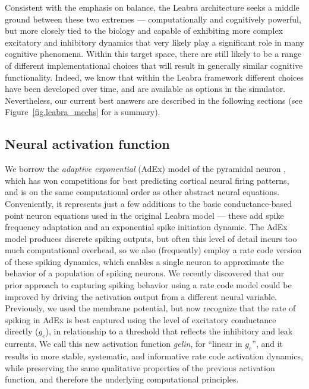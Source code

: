 \documentclass[11pt,twoside]{article}
\begin{document}
Consistent with the emphasis on balance, the Leabra architecture seeks a
middle ground between these two extremes --- computationally and cognitively
powerful, but more closely tied to the biology and capable of exhibiting more
complex excitatory and inhibitory dynamics that very likely play a significant
role in many cognitive phenomena.  Within this target space, there are still
likely to be a range of different implementational choices that will result in
generally similar cognitive functionality.  Indeed, we know that within the
Leabra framework different choices have been developed over time, and are
available as options in the simulator.  Nevertheless, our current best answers
are described in the following sections (see Figure~\ref{fig.leabra_mechs} for
a summary).

\subsection{Neural activation function}

We borrow the {\em adaptive exponential} (AdEx) model of the pyramidal neuron
\cite{BretteGerstner05}, which has won competitions for best predicting
cortical neural firing patterns, and is on the same computational order as
other abstract neural equations.  Conveniently, it represents just a few
additions to the basic conductance-based point neuron equations used in the
original Leabra model --- these add spike frequency adaptation and an
exponential spike initiation dynamic.  The AdEx model produces discrete
spiking outputs, but often this level of detail incurs too much computational
overhead, so we also (frequently) employ a rate code version of these spiking
dynamics, which enables a single neuron to approximate the behavior of a
population of spiking neurons.  We recently discovered that our prior approach
to capturing spiking behavior using a rate code model could be improved by
driving the activation output from a different neural variable.  Previously, we
used the membrane potential, but now recognize that the rate of spiking in
AdEx is best captured using the level of excitatory conductance directly
($g_e$), in relationship to a threshold that reflects the inhibitory and leak
currents.  We call this new activation function {\em gelin}, for ``linear in
$g_e$'', and it results in more stable, systematic, and informative rate code
activation dynamics, while preserving the same qualitative properties of the
previous activation function, and therefore the underlying computational
principles.
\end{document}
